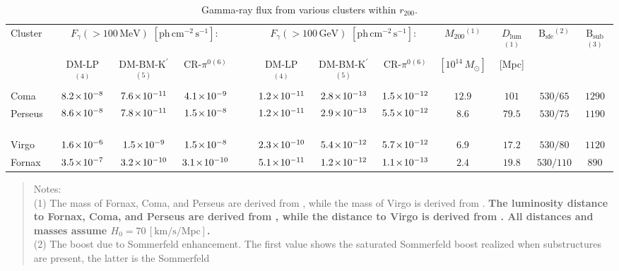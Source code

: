 \documentclass[10pt,aps,pra,reprint,amsmath,amsfonts,amssymb,showpacs,nofootinbib,floatfix]{revtex4-1}
\def\C#1{{\bf #1}}
\newcommand{\rmn}{\mathrm}
\newcommand{\msun}{M_\odot}
\newcommand{\Kp}{\rmn{K}^\prime}
\newcommand{\B}{\rmn{B}}
\newcommand{\mytimes}{\hspace{-0.5mm}\times\hspace{-0.5mm}}
\newcommand{\hst}{\hspace{-1.0mm}}
\newcommand{\rvir}{r_{200}}
\newcommand{\mvir}{M_{200}}
\begin{document}
\begin{table}\hst\hst\hst\hst\hst\hst\hst
\begin{minipage}{2.0\columnwidth}
  \caption{Gamma-ray flux from various clusters within $\rvir$.}
\begin{tabular}{l c c c c c c c c c c c}
\hline
\hline
 Cluster &
\multicolumn{3}{c}{$F_{\gamma}(>100\,\rmn{MeV})$ $[\rmn{ph}\,\rmn{cm}^{-2}\,\rmn{s}^{-1}]$:} & &
\multicolumn{3}{c}{$F_{\gamma}(>100\,\rmn{GeV})$ $[\rmn{ph}\,\rmn{cm}^{-2}\,\rmn{s}^{-1}]$:} &
$\mvir$$^{(1)}$ & $D_\rmn{lum}$$^{(1)}$ & $\B_\rmn{sfe}$$^{(2)}$ & $\B_\rmn{sub}$$^{(3)}$ \\
         & DM-LP$^{(4)}$ & DM-BM-$\Kp$$^{(5)}$ & CR-$\pi^0$$^{(6)}$
         & & DM-LP$^{(4)}$ & DM-BM-$\Kp$$^{(5)}$ & CR-$\pi^0$$^{(6)}$ 
         & $[10^{14}\,\msun]$ & [Mpc] && \\
 \hline
 Coma & $8.2\mytimes10^{-8}$ & $7.6\mytimes10^{-11}$ & $4.1\mytimes10^{-9}$
 & \,\,\,\,\, & $1.2\mytimes10^{-11}$ & $2.8\mytimes10^{-13}$ & $1.5\mytimes10^{-12}$
 & $12.9$ & $101$ & $530/65$ & $1290$ \\
 Perseus \,\,\,\,\,\, & $8.6\mytimes10^{-8}$ & $7.8\mytimes10^{-11}$ & $1.5\mytimes10^{-8}$
 & \,\,\,\,\, & $1.2\mytimes10^{-11}$ & $2.9\mytimes10^{-13}$ & $5.5\mytimes10^{-12}$
 & $8.6$ & $79.5$ & $530/75$ & $1190$ \\
 Virgo & $1.6\mytimes10^{-6}$ & $1.5\mytimes10^{-9}$ & $1.5\mytimes10^{-8}$
 & \,\,\,\,\, & $2.3\mytimes10^{-10}$ & $5.4\mytimes10^{-12}$ & $5.7\mytimes10^{-12}$
 & $6.9$ & $17.2$ & $530/80$ & $1120$ \\
 Fornax & $3.5\mytimes10^{-7}$ & $3.2\mytimes10^{-10}$ & $3.1\mytimes10^{-10}$
 & \,\,\,\,\, & $5.1\mytimes10^{-11}$ & $1.2\mytimes10^{-12}$ & $1.1\mytimes10^{-13}$
 & $2.4$ & $19.8$ & $530/110$ & $890$ \\
\hline
\hline
\end{tabular}
\begin{quote}
  Notes: \\
  (1) The mass of Fornax, Coma, and Perseus are derived from \cite{2007A&A...466..805C},
  while the mass of Virgo is derived from \cite{1984ApJ...281...31T}. \C{The luminosity 
    distance to Fornax, Coma, and Perseus are derived from \cite{2007A&A...466..805C},
    while the distance to Virgo is derived from \cite{2007ApJ...655..144M}. All distances 
    and masses assume $H_0= 70\,[\rmn{km}/\rmn{s}/\rmn{Mpc}]$.}\\
  (2) The boost due to Sommerfeld enhancement. The first value shows the saturated
  Sommerfeld boost realized when substructures are present, the latter is the Sommerfeld

\end{quote}
\end{minipage}
\end{table}
\end{document}
